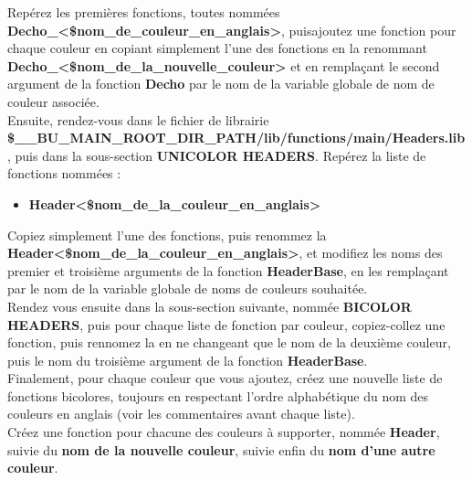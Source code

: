 \documentclass[a4paper,10pt]{article}
\begin{document}
Repérez les premières fonctions, toutes nommées \textbf{\color{mauve}Decho\_<\$nom\_de\_couleur\_en\_anglais>}, puis\linebreak ajoutez une fonction pour chaque couleur en copiant simplement l'une des fonctions en la renommant \textbf{\color{mauve}Decho\_<\$nom\_de\_la\_nouvelle\_couleur>} et en remplaçant le second argument de la fonction \textbf{\color{mauve}Decho} par le nom de la variable globale de nom de couleur associée.\\[2\baselineskip]


Ensuite, rendez-vous dans le fichier de librairie \textbf{\color{orange}\$\_\_BU\_MAIN\_ROOT\_DIR\_PATH\color{lime}/lib/functions/main/Headers.lib}, puis dans la sous-section \textbf{UNICOLOR HEADERS}. Repérez la liste de fonctions nommées :
\begin{itemize}
    \item \textbf{\color{mauve}Header<\$nom\_de\_la\_couleur\_en\_anglais>}\linebreak
\end{itemize}

Copiez simplement l'une des fonctions, puis renommez la \textbf{\color{mauve}Header<\$nom\_de\_la\_couleur\_en\_anglais>},\linebreak
et modifiez les noms des premier et troisième arguments de la fonction \textbf{\color{mauve}HeaderBase}, en les\linebreak
remplaçant par le nom de la variable globale de noms de couleurs souhaitée.\\[1\baselineskip]

Rendez vous ensuite dans la sous-section suivante, nommée \textbf{BICOLOR HEADERS}, puis pour chaque liste de fonction par couleur, copiez-collez une fonction, puis rennomez la en ne changeant que le nom de la deuxième couleur, puis le nom du troisième argument de la fonction \textbf{\color{mauve}HeaderBase}.\\[1\baselineskip]

Finalement, pour chaque couleur que vous ajoutez, créez une nouvelle liste de fonctions bicolores,\linebreak
toujours en respectant l'ordre alphabétique du nom des couleurs en anglais (voir les commentaires\linebreak
avant chaque liste).\\[1\baselineskip]

Créez une fonction pour chacune des couleurs à supporter, nommée \textbf{\color{mauve}Header}, suivie du \textbf{\color{mauve}nom de la\linebreak
nouvelle couleur}, suivie enfin du \textbf{\color{mauve}nom d'une autre couleur}.\\[1\baselineskip]
\end{document}
